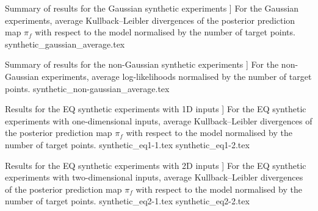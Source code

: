 \documentclass[12pt, twoside]{report}
\begin{document}
\begin{table}[t]
    \centering
    \caption
    [
        Summary of results for the Gaussian synthetic experiments
    ]
    {
        For the Gaussian experiments, average Kullback--Leibler divergences of the posterior prediction map $\pi_f$ with respect to the model normalised by the number of target points.
        \onedtwoddescription
        \latentvariabledescription
        \diagonaldescription
        \trivialdescription
        \numbersdescription
    }
    \label{tab:synthetic_Gaussian}
    \small
    \setlength{\tabcolsep}{3pt}
    {synthetic_gaussian_average.tex}
\end{table}

\begin{table}[t]
    \centering
    \caption
    [
        Summary of results for the non-Gaussian synthetic experiments
    ]
    {
        For the non-Gaussian experiments, average log-likelihoods normalised by the number of target points.
        \onedtwoddescription
        \latentvariabledescription
        \trivialdescription
        \numbersdescription
    }
    \label{tab:synthetic_non-Gaussian}
    \small
    \setlength{\tabcolsep}{3pt}
    {synthetic_non-gaussian_average.tex}
\end{table}

\begin{table}[t]
    \centering
    \caption
    [
        Results for the EQ synthetic experiments with 1D inputs
    ]
    {
        For the EQ synthetic experiments with one-dimensional inputs, average Kullback--Leibler divergences of the posterior prediction map $\pi_f$ with respect to the model normalised by the number of target points.
        \oneddescription
        \latentvariabledescription
        \diagonaldescription
        \trivialdescription
        \numbersdescription
    }
    \label{tab:synthetic_eq-1}
    \footnotesize
    \setlength{\tabcolsep}{2pt}
    {synthetic_eq1-1.tex}
    {synthetic_eq1-2.tex}
\end{table}

\begin{table}[t]
    \centering
    \caption
    [
        Results for the EQ synthetic experiments with 2D inputs
    ]
    {
        For the EQ synthetic experiments with two-dimensional inputs, average Kullback--Leibler divergences of the posterior prediction map $\pi_f$ with respect to the model normalised by the number of target points.
        \twoddescription
        \latentvariabledescription
        \diagonaldescription
        \trivialdescription
        \numbersdescription
    }
    \label{tab:synthetic_eq-2}
    \footnotesize
    \setlength{\tabcolsep}{2pt}
    {synthetic_eq2-1.tex}
    {synthetic_eq2-2.tex}
\end{table}
\end{document}
